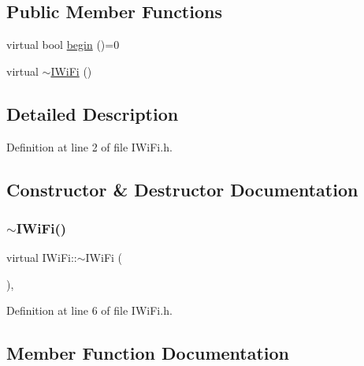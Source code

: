 \subsection*{Public Member Functions}
\begin{DoxyCompactItemize}
\item 
virtual bool \hyperlink{class_i_wi_fi_a84af90ca78639bda7a1a72f670cfc27b}{begin} ()=0
\item 
virtual \hyperlink{class_i_wi_fi_a3e787ec2405da193b7833e35b78a4d29}{$\sim$\+I\+Wi\+Fi} ()
\end{DoxyCompactItemize}


\subsection{Detailed Description}


Definition at line 2 of file I\+Wi\+Fi.\+h.



\subsection{Constructor \& Destructor Documentation}
\mbox{\label{class_i_wi_fi_a3e787ec2405da193b7833e35b78a4d29}} 
\subsubsection{\texorpdfstring{$\sim$\+I\+Wi\+Fi()}{~IWiFi()}}
{\footnotesize\ttfamily virtual I\+Wi\+Fi\+::$\sim$\+I\+Wi\+Fi (\begin{DoxyParamCaption}{ }\end{DoxyParamCaption})\hspace{0.3cm}{\ttfamily [inline]}, {\ttfamily [virtual]}}



Definition at line 6 of file I\+Wi\+Fi.\+h.



\subsection{Member Function Documentation}
\mbox{\label{class_i_wi_fi_a84af90ca78639bda7a1a72f670cfc27b}} 
